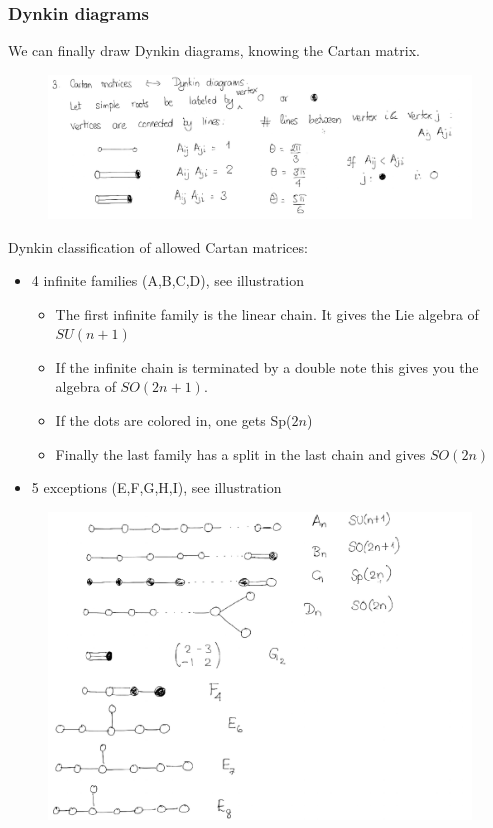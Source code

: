 \documentclass[a4paper,12pt]{article}
\begin{document}
\subsubsection{Dynkin diagrams}
We can finally draw Dynkin diagrams, knowing the Cartan matrix.
\begin{figure}[H]
	\centering
	\includegraphics[width=1\linewidth]{28}
\end{figure} 
Dynkin classification of allowed Cartan matrices:
\begin{itemize}
	\item 4 infinite families (A,B,C,D), see illustration
	\begin{itemize}
		\item The first infinite family is the linear chain. It gives the Lie algebra of $SU(n+1)$
		\item If the infinite chain is terminated by a double note this gives you the algebra of $SO(2n+1)$.
		\item If the dots are colored in, one gets Sp($2n$)
		\item Finally the last family has a split in the last chain and gives $SO(2n)$
	\end{itemize}
	\item 5 exceptions (E,F,G,H,I), see illustration
\end{itemize}
\begin{figure}[H]
	\centering
	\includegraphics[width=0.8\linewidth]{29}
\end{figure} 
\newpage
\end{document}
